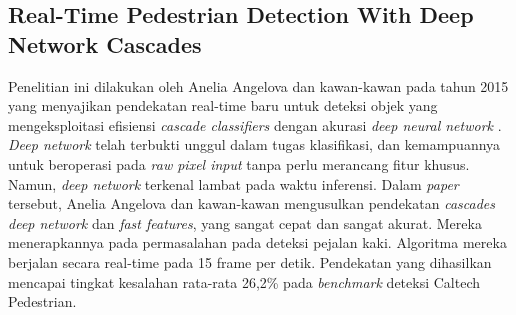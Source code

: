 \subsection{Real-Time Pedestrian Detection With Deep Network Cascades}
\label{realtime pedestrian}

Penelitian ini dilakukan oleh Anelia Angelova dan kawan-kawan pada tahun 2015 yang menyajikan pendekatan real-time baru untuk deteksi objek yang mengeksploitasi efisiensi \textit{cascade classifiers} dengan akurasi \textit{deep neural network} \citep{penelitianterkait1}. \textit{Deep network} telah terbukti unggul dalam tugas klasifikasi, dan kemampuannya untuk beroperasi pada \textit{raw pixel input} tanpa perlu merancang fitur khusus. Namun, \textit{deep network} terkenal lambat pada waktu inferensi. Dalam \textit{paper} tersebut, Anelia Angelova dan kawan-kawan mengusulkan pendekatan \textit{cascades deep network} dan \textit{fast features}, yang sangat cepat dan sangat akurat. Mereka menerapkannya pada permasalahan pada deteksi pejalan kaki. Algoritma mereka berjalan secara real-time pada 15 frame per detik. Pendekatan yang dihasilkan mencapai tingkat kesalahan rata-rata 26,2\% pada \textit{benchmark} deteksi Caltech Pedestrian.